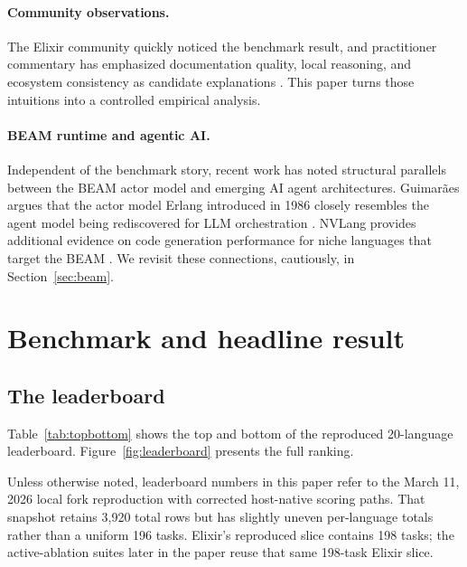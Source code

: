 \documentclass[11pt]{article}
\newcommand{\elixir}{Elixir}
\begin{document}
\paragraph{Community observations.}
The \elixir{} community quickly noticed the benchmark result, and practitioner commentary has emphasized documentation quality, local reasoning, and ecosystem consistency as candidate explanations \cite{dashbit,ronacher}. This paper turns those intuitions into a controlled empirical analysis.

\paragraph{BEAM runtime and agentic AI.}
Independent of the benchmark story, recent work has noted structural parallels between the BEAM actor model and emerging AI agent architectures. Guimar\~{a}es argues that the actor model Erlang introduced in 1986 closely resembles the agent model being rediscovered for LLM orchestration \cite{guimaraes}. NVLang provides additional evidence on code generation performance for niche languages that target the BEAM \cite{nvlang}. We revisit these connections, cautiously, in Section~\ref{sec:beam}.

\section{Benchmark and headline result}

\subsection{The leaderboard}

Table~\ref{tab:topbottom} shows the top and bottom of the reproduced 20-language leaderboard. Figure~\ref{fig:leaderboard} presents the full ranking.

Unless otherwise noted, leaderboard numbers in this paper refer to the March 11, 2026 local fork reproduction with corrected host-native scoring paths. That snapshot retains 3{,}920 total rows but has slightly uneven per-language totals rather than a uniform 196 tasks. Elixir's reproduced slice contains 198 tasks; the active-ablation suites later in the paper reuse that same 198-task Elixir slice.
\end{document}
